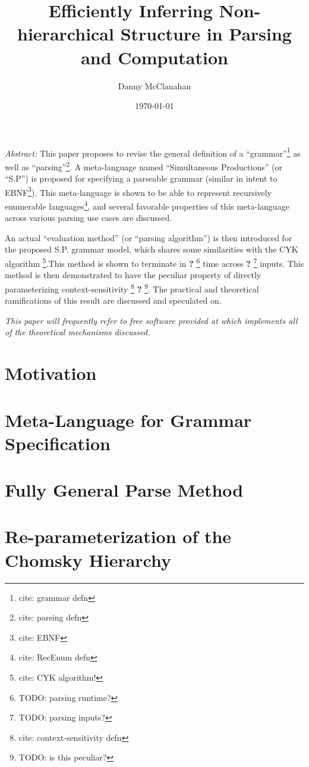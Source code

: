 \documentclass[10pt]{article}
\title{Efficiently Inferring Non-hierarchical Structure in Parsing and Computation}
\date{\today}
\author{Danny McClanahan}
\newcommand{\todocite}[1]{\footnote{cite: #1}}
\newcommand{\todo}[1]{\textbf{?} \footnote{TODO: #1}}
\begin{document}
\maketitle

\textit{Abstract:} This paper proposes to revise the general definition of a ``grammar''\todocite{grammar defn} as well as ``parsing''\todocite{parsing defn}. A meta-language named ``Simultaneous Productions'' (or ``S.P'') is proposed for specifying a parseable grammar (similar in intent to EBNF\todocite{EBNF}). This meta-language is shown to be able to represent recursively enumerable languages\todocite{RecEnum defn}, and several favorable properties of this meta-language across various parsing use cases are discussed.

An actual ``evaluation method'' (or ``parsing algorithm'') is then introduced for the proposed S.P. grammar model, which shares some similarities with the CYK algorithm \todocite{CYK algorithm!}.This method is shown to terminate in \todo{parsing runtime?} time across \todo{parsing inputs?} inputs. This method is then demonstrated to have the peculiar property of directly parameterizing context-sensitivity \todocite{context-sensitivity defn} \todo{is this peculiar?}. The practical and theoretical ramifications of this result are discussed and speculated on.

\textit{This paper will frequently refer to free software provided at \cite{repo-sp} which implements all of the theoretical mechanisms discussed.}

\newpage
\tableofcontents
\newpage

\section{Motivation}
\label{sec:motivation}

\section{Meta-Language for Grammar Specification}
\label{sec:meta-language-for-grammar-specification}

\section{Fully General Parse Method}
\label{sec:fully-general-parse-method}

\section{Re-parameterization of the Chomsky Hierarchy}
\label{sec:re-parameterization-of-the-chomsky-hierarchy}
\end{document}
